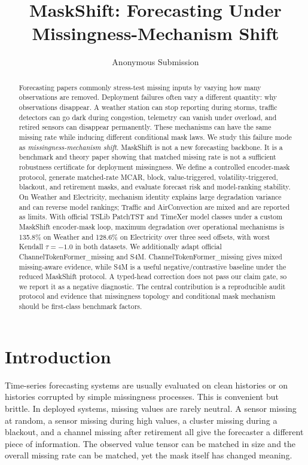 \documentclass[letterpaper]{article}
\title{MaskShift: Forecasting Under Missingness-Mechanism Shift}
\author{Anonymous Submission}
\begin{document}
\maketitle

\begin{abstract}
Forecasting papers commonly stress-test missing inputs by varying how many observations are removed. Deployment failures often vary a different quantity: why observations disappear. A weather station can stop reporting during storms, traffic detectors can go dark during congestion, telemetry can vanish under overload, and retired sensors can disappear permanently. These mechanisms can have the same missing rate while inducing different conditional mask laws. We study this failure mode as \emph{missingness-mechanism shift}. MaskShift is not a new forecasting backbone. It is a benchmark and theory paper showing that matched missing rate is not a sufficient robustness certificate for deployment missingness. We define a controlled encoder-mask protocol, generate matched-rate MCAR, block, value-triggered, volatility-triggered, blackout, and retirement masks, and evaluate forecast risk and model-ranking stability. On Weather and Electricity, mechanism identity explains large degradation variance and can reverse model rankings; Traffic and AirConvection are mixed and are reported as limits. With official TSLib PatchTST and TimeXer model classes under a custom MaskShift encoder-mask loop, maximum degradation over operational mechanisms is 135.8\% on Weather and 128.6\% on Electricity over three seed offsets, with worst Kendall $\tau=-1.0$ in both datasets. We additionally adapt official ChannelTokenFormer\_missing and S4M. ChannelTokenFormer\_missing gives mixed missing-aware evidence, while S4M is a useful negative/contrastive baseline under the reduced MaskShift protocol. A typed-head correction does not pass our claim gate, so we report it as a negative diagnostic. The central contribution is a reproducible audit protocol and evidence that missingness topology and conditional mask mechanism should be first-class benchmark factors.
\end{abstract}

\section{Introduction}

Time-series forecasting systems are usually evaluated on clean histories or on histories corrupted by simple missingness processes. This is convenient but brittle. In deployed systems, missing values are rarely neutral. A sensor missing at random, a sensor missing during high values, a cluster missing during a blackout, and a channel missing after retirement all give the forecaster a different piece of information. The observed value tensor can be matched in size and the overall missing rate can be matched, yet the mask itself has changed meaning.
\end{document}
